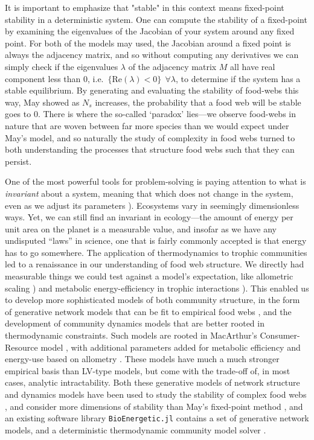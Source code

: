 \documentclass[]{article}
\begin{document}
It is important to emphasize that "stable" in this context means
fixed-point stability in a deterministic system. One can compute the
stability of a fixed-point by examining the eigenvalues of the Jacobian
of your system around any fixed point. For both of the models may used,
the Jacobian around a fixed point is always the adjacency matrix, and so
without computing any derivatives we can simply check if the eigenvalues
\(\lambda\) of the adjacency matrix \(M\) all have real component less
than \(0\), i.e.~\(\{ \text{Re}(\lambda) < 0 \} \ \ \forall\lambda\), to
determine if the system has a stable equilibrium. By generating and
evaluating the stability of food-webs this way, May showed as \(N_s\)
increases, the probability that a food web will be stable goes to \(0\).
There is where the so-called `paradox' lies---we observe food-webs in
nature that are woven between far more species than we would expect
under May's model, and so naturally the study of complexity in food webs
turned to both understanding the processes that structure food webs such
that they can persist.

One of the most powerful tools for problem-solving is paying attention
to what is \emph{invariant} about a system, meaning that which does not
change in the system, even as we adjust its parameters
\citep{@polya_how_2009}). Ecosystems vary in seemingly dimensionless ways.
Yet, we can still find an invariant in ecology---the amount of energy
per unit area on the planet is a measurable value, and insofar as we
have any undisputed ``laws'' in science, one that is fairly commonly
accepted is that energy has to go somewhere. The application of
thermodynamics to trophic communities led to a renaissance in our
understanding of food web structure. We directly had measurable things
we could test against a model's expectation, like allometric scaling
\citep{cohen_food_1977, gravel_trophic_2011, stouffer_robust_2006}) and metabolic energy-efficiency in
trophic interactions \citep{yodzis_body_1992}). This enabled us to
develop more sophisticated models of both community structure, in the
form of generative network models \citep{cohen_food_1977,williams_simple_2000} that can be fit to empirical food webs \citep{allesina_general_2008}, and the development of community
dynamics models that are better rooted in thermodynamic constraints. Such models are rooted in MacArthur's Consumer-Resource model \cite{macarthur_cr}, with additional parameters added for metabolic efficiency and energy-use based on allometry \citep{yodzis_body_1992}. These models have much a much stronger empirical basis than LV-type models, but come with the trad\renewcommand*{\arraystretch}{1.4}e-off of, in most cases, analytic intractability. Both these generative models of network structure and dynamics models have been used to study the stability of complex food webs \cite{allesina_stability_2012,allesina_predicting_2015}, and consider more dimensions of stability than May's fixed-point method \cite{dominguezpaper}, and an existing software library \texttt{BioEnergetic.jl} contains a set of generative network models, and a deterministic thermodynamic community model solver \citep{delmas_simulation_2017}.
\end{document}
